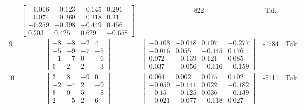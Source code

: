 \documentclass[a4paper,12pt]{article}
\begin{document}
\begin{tabular}{c c c c c}
&
$\begin{bmatrix} -0.016 & -0.123 & -0.145 & 0.291 \\ -0.074 & -0.269 & -0.218 & 0.21 \\ -0.259 & -0.398 & -0.449 & 0.456 \\ 0.203 & 0.425 & 0.629 & -0.658 \end{bmatrix}$
&
822
&
Tak
\\
9
&
$\begin{bmatrix} -8 & -8 & -2 & 4 \\ -5 & -9 & -7 & -5 \\ -1 & -7 & 0 & -6 \\ 0 & 2 & 2 & -3 \end{bmatrix}$
&
$\begin{bmatrix} -0.108 & -0.048 & 0.107 & -0.277 \\ -0.016 & 0.055 & -0.145 & 0.176 \\ 0.072 & -0.139 & 0.121 & 0.085 \\ 0.037 & -0.056 & -0.016 & -0.159 \end{bmatrix}$
&
-1784
&
Tak
\\
10
&
$\begin{bmatrix} 2 & 8 & -9 & 0 \\ -2 & -4 & 2 & -9 \\ 9 & 0 & 5 & -8 \\ 2 & -5 & 2 & 6 \end{bmatrix}$
&
$\begin{bmatrix} 0.064 & 0.002 & 0.075 & 0.102 \\ -0.059 & -0.141 & 0.022 & -0.182 \\ -0.15 & -0.125 & 0.036 & -0.139 \\ -0.021 & -0.077 & -0.018 & 0.027 \end{bmatrix}$
&
-5111
&
Tak
\\
\end{tabular} \egroup \newpage
\end{document}

